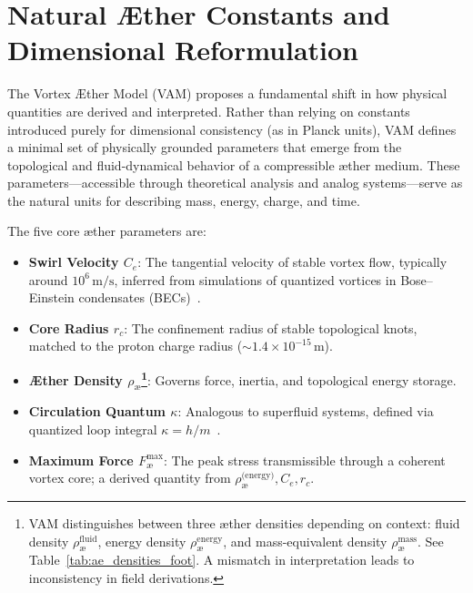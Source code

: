 \section{Natural Æther Constants and Dimensional Reformulation}

The Vortex Æther Model (VAM) proposes a fundamental shift in how physical quantities are derived and interpreted. Rather than relying on constants introduced purely for dimensional consistency (as in Planck units), VAM defines a minimal set of physically grounded parameters that emerge from the topological and fluid-dynamical behavior of a compressible æther medium. These parameters—accessible through theoretical analysis and analog systems—serve as the natural units for describing mass, energy, charge, and time.

The five core æther parameters are:

\begin{itemize}
    \item \textbf{Swirl Velocity \( C_e \)}: The tangential velocity of stable vortex flow, typically around \( 10^6 \, \text{m/s} \), inferred from simulations of quantized vortices in Bose–Einstein condensates (BECs)~\cite{Pethick2008BEC, Kleckner2013KnottedVortices}.

    \item \textbf{Core Radius \( r_c \)}: The confinement radius of stable topological knots, matched to the proton charge radius (\( \sim 1.4 \times 10^{-15} \, \text{m} \)).

    \item \textbf{Æther Density \( \rho_\text{\ae} \)\footnote{VAM distinguishes between three æther densities depending on context: fluid density \( \rho_\text{\ae}^{\text{fluid}} \), energy density \( \rho_\text{\ae}^{\text{energy}} \), and mass-equivalent density \( \rho_\text{\ae}^{\text{mass}} \). See Table~\ref{tab:ae_densities_foot}. A mismatch in interpretation leads to inconsistency in field derivations.}}: Governs force, inertia, and topological energy storage.

    \item \textbf{Circulation Quantum \( \kappa \)}: Analogous to superfluid systems, defined via quantized loop integral \( \kappa = h / m \)~\cite{Donnelly1991QuantizedVortices}.

    \item \textbf{Maximum Force \( F^{\text{max}}_{\text{\ae}} \)}: The peak stress transmissible through a coherent vortex core; a derived quantity from \( \rho_\text{\ae}^{\text{(energy)}}, C_e, r_c \).
\end{itemize}

